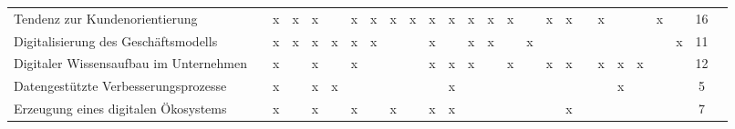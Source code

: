 \begin{sidewaystable}[ht]
\begin{tabular}{|p{6cm}|c|c|c|c|c|c|c|c|c|c|c|c|c|c|c|c|c|c|c|c|c|c|c|c|c|}
		Tendenz zur Kundenorientierung                      &                   & x                  & x                  & x                    &                    & x                 & x                 & x                    & x                  & x                    & x                & x                & x                   & x                &                 & x                    & x                  &                 & x                &                  &                        & x                    &                        & 16 \\
		Digitalisierung des Geschäftsmodells     &                   & x                  & x                  & x                    & x                  & x                 & x                 &                      &                    & x                    &                  & x                & x                   &                  & x               &                      &                    &                 &                  &                  &                        &                      & x                      & 11 \\
		Digitaler Wissensaufbau im Unternehmen              &                   & x                  &                    & x                    &                    & x                 &                   &                      &                    & x                    & x                & x                &                     & x                &                 & x                    & x                  &                 & x                & x                & x                      &                      &                        & 12 \\
		Datengestützte Verbesserungsprozesse    &                   & x                  &                    & x                    & x                  &                   &                   &                      &                    &                      & x                &                  &                     &                  &                 &                      &                    &                 &                  & x                &                        &                      &                        & 5  \\
		Erzeugung eines digitalen Ökosystems &                   & x                  &                    & x                    &                    & x                 &                   & x                    &                    & x                    & x                &                  &                     &                  &                 &                      & x                  &                 &                  &                  &                        &                      &                        & 7  \\

\end{tabular}
\end{sidewaystable}
